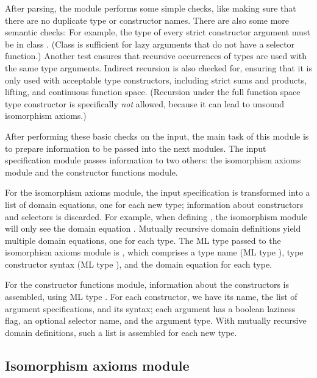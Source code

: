 After parsing, the module performs some simple checks, like making sure that there are no duplicate type or constructor names. There are also some more semantic checks: For example, the type of every strict constructor argument must be in class . (Class  is sufficient for lazy arguments that do not have a selector function.) Another test ensures that recursive occurrences of types are used with the same type arguments. Indirect recursion is also checked for, ensuring that it is only used with acceptable type constructors, including strict sums and products, lifting, and continuous function space. (Recursion under the full function space type constructor is specifically \emph{not} allowed, because it can lead to unsound isomorphism axioms.)

After performing these basic checks on the input, the main task of this module is to prepare information to be passed into the next modules. The input specification module passes information to two others: the isomorphism axioms module and the constructor functions module.

For the isomorphism axioms module, the input specification is transformed into a list of domain equations, one for each new type; information about constructors and selectors is discarded. For example, when defining  , the isomorphism module will only see the domain equation . Mutually recursive domain definitions yield multiple domain equations, one for each type. The ML type passed to the isomorphism axioms module is , which comprises a type name (ML type ), type constructor syntax (ML type ), and the domain equation for each type.

For the constructor functions module, information about the constructors is assembled, using ML type  . For each constructor, we have its name, the list of argument specifications, and its syntax; each argument has a boolean laziness flag, an optional selector name, and the argument type. With mutually recursive domain definitions, such a list is assembled for each new type.

\subsection{Isomorphism axioms module}

